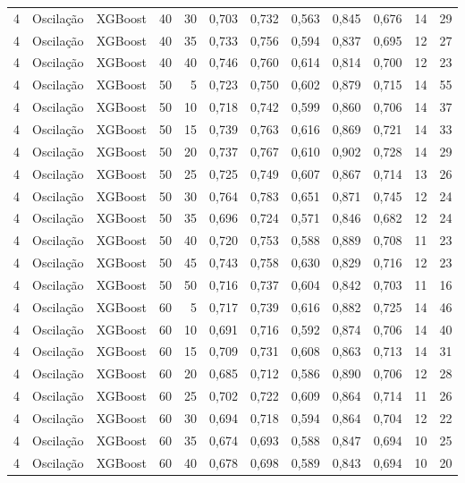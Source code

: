 \begin{longtable}{@{}rllrrrrrrrrr@{}}
4 & Oscilação & XGBoost & 40 & 30 & 0,703 & 0,732 & 0,563 & 0,845 & 0,676 & 14 & 29 \\
4 & Oscilação & XGBoost & 40 & 35 & 0,733 & 0,756 & 0,594 & 0,837 & 0,695 & 12 & 27 \\
4 & Oscilação & XGBoost & 40 & 40 & 0,746 & 0,760 & 0,614 & 0,814 & 0,700 & 12 & 23 \\
4 & Oscilação & XGBoost & 50 & 5 & 0,723 & 0,750 & 0,602 & 0,879 & 0,715 & 14 & 55 \\
4 & Oscilação & XGBoost & 50 & 10 & 0,718 & 0,742 & 0,599 & 0,860 & 0,706 & 14 & 37 \\
4 & Oscilação & XGBoost & 50 & 15 & 0,739 & 0,763 & 0,616 & 0,869 & 0,721 & 14 & 33 \\
4 & Oscilação & XGBoost & 50 & 20 & 0,737 & 0,767 & 0,610 & 0,902 & 0,728 & 14 & 29 \\
4 & Oscilação & XGBoost & 50 & 25 & 0,725 & 0,749 & 0,607 & 0,867 & 0,714 & 13 & 26 \\
4 & Oscilação & XGBoost & 50 & 30 & 0,764 & 0,783 & 0,651 & 0,871 & 0,745 & 12 & 24 \\
4 & Oscilação & XGBoost & 50 & 35 & 0,696 & 0,724 & 0,571 & 0,846 & 0,682 & 12 & 24 \\
4 & Oscilação & XGBoost & 50 & 40 & 0,720 & 0,753 & 0,588 & 0,889 & 0,708 & 11 & 23 \\
4 & Oscilação & XGBoost & 50 & 45 & 0,743 & 0,758 & 0,630 & 0,829 & 0,716 & 12 & 23 \\
4 & Oscilação & XGBoost & 50 & 50 & 0,716 & 0,737 & 0,604 & 0,842 & 0,703 & 11 & 16 \\
4 & Oscilação & XGBoost & 60 & 5 & 0,717 & 0,739 & 0,616 & 0,882 & 0,725 & 14 & 46 \\
4 & Oscilação & XGBoost & 60 & 10 & 0,691 & 0,716 & 0,592 & 0,874 & 0,706 & 14 & 40 \\
4 & Oscilação & XGBoost & 60 & 15 & 0,709 & 0,731 & 0,608 & 0,863 & 0,713 & 14 & 31 \\
4 & Oscilação & XGBoost & 60 & 20 & 0,685 & 0,712 & 0,586 & 0,890 & 0,706 & 12 & 28 \\
4 & Oscilação & XGBoost & 60 & 25 & 0,702 & 0,722 & 0,609 & 0,864 & 0,714 & 11 & 26 \\
4 & Oscilação & XGBoost & 60 & 30 & 0,694 & 0,718 & 0,594 & 0,864 & 0,704 & 12 & 22 \\
4 & Oscilação & XGBoost & 60 & 35 & 0,674 & 0,693 & 0,588 & 0,847 & 0,694 & 10 & 25 \\
4 & Oscilação & XGBoost & 60 & 40 & 0,678 & 0,698 & 0,589 & 0,843 & 0,694 & 10 & 20 \\

\end{longtable}
